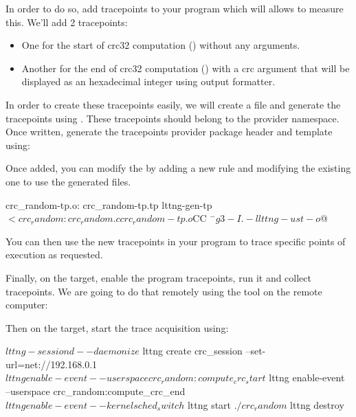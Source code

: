 In order to do so, add tracepoints to your program which will allows to measure
this. We'll add 2 tracepoints:

\begin{itemize}
  \item One for the start of crc32 computation ()
    without any arguments.
  \item Another for the end of crc32 computation () with
      a crc  argument that will be displayed as an hexadecimal integer
      using  output formatter.
\end{itemize}

In order to create these tracepoints easily, we will create a
 file and generate the tracepoints using
. These tracepoints should belong to the 
provider namespace. Once written, generate the tracepoints provider package
header and template using:

Once added, you can modify the  by adding a new rule and
modifying the existing one to use the generated files.

\begin{bashinput}
  crc_random-tp.o: crc_random-tp.tp
    lttng-gen-tp $<
  
  crc_random: crc_random.c crc_random-tp.o
    ${CC} $^ -g3 -I. -llttng-ust -o $@
  \end{bashinput}

You can then use the new tracepoints in your program to trace specific points
of execution as requested.

Finally, on the target, enable the program tracepoints, run it and collect
tracepoints. We are going to do that remotely using the  tool
on the remote computer:


Then on the target, start the trace acquisition using:

\begin{bashinput}
$ lttng-sessiond --daemonize
$ lttng create crc_session --set-url=net://192.168.0.1
$ lttng enable-event --userspace crc_random:compute_crc_start
$ lttng enable-event --userspace crc_random:compute_crc_end
$ lttng enable-event --kernel sched_switch
$ lttng start
$ ./crc_random
$ lttng destroy
\end{bashinput}

